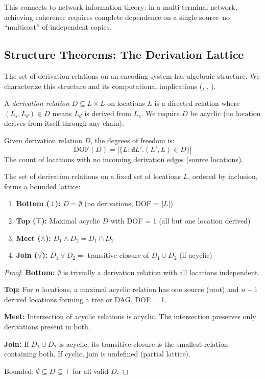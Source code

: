 This connects to network information theory: in a multi-terminal network, achieving coherence requires complete dependence on a single source--no ``multicast'' of independent copies.

\subsection{Structure Theorems: The Derivation Lattice}\label{sec:derivation-structure}

The set of derivation relations on an encoding system has algebraic structure. We characterize this structure and its computational implications (, , ).

\begin{definition}\label{def:derivation-relation}
A \emph{derivation relation} $D \subseteq L \times L$ on locations $L$ is a directed relation where $(L_s, L_d) \in D$ means $L_d$ is derived from $L_s$. We require $D$ be acyclic (no location derives from itself through any chain).
\end{definition}

\begin{definition}\label{def:dof-derivation}
Given derivation relation $D$, the degrees of freedom is:
\[
\text{DOF}(D) = |\{L : \nexists L'. (L', L) \in D\}|
\]
The count of locations with no incoming derivation edges (source locations).
\end{definition}

\begin{theorem}\label{thm:derivation-lattice}
The set of derivation relations on a fixed set of locations $L$, ordered by inclusion, forms a bounded lattice:
\begin{enumerate}
\tightlist
\item \textbf{Bottom ($\bot$):} $D = \emptyset$ (no derivations, DOF = $|L|$)
\item \textbf{Top ($\top$):} Maximal acyclic $D$ with DOF = 1 (all but one location derived)
\item \textbf{Meet ($\land$):} $D_1 \land D_2 = D_1 \cap D_2$
\item \textbf{Join ($\lor$):} $D_1 \lor D_2 = $ transitive closure of $D_1 \cup D_2$ (if acyclic)
\end{enumerate}
\end{theorem}

\begin{proof}
\textbf{Bottom:} $\emptyset$ is trivially a derivation relation with all locations independent.

\textbf{Top:} For $n$ locations, a maximal acyclic relation has one source (root) and $n-1$ derived locations forming a tree or DAG. DOF = 1.

\textbf{Meet:} Intersection of acyclic relations is acyclic. The intersection preserves only derivations present in both.

\textbf{Join:} If $D_1 \cup D_2$ is acyclic, its transitive closure is the smallest relation containing both. If cyclic, join is undefined (partial lattice).

Bounded: $\emptyset \subseteq D \subseteq \top$ for all valid $D$.
\end{proof}

